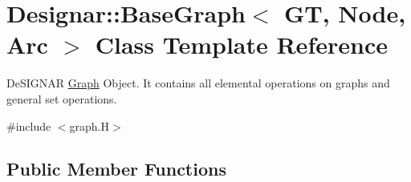 \hypertarget{class_designar_1_1_base_graph}{}\section{Designar\+:\+:Base\+Graph$<$ GT, Node, Arc $>$ Class Template Reference}
\label{class_designar_1_1_base_graph}


De\+S\+I\+G\+N\+AR \hyperlink{class_designar_1_1_graph}{Graph} Object. It contains all elemental operations on graphs and general set operations.  




{\ttfamily \#include $<$graph.\+H$>$}

\subsection*{Public Member Functions}
